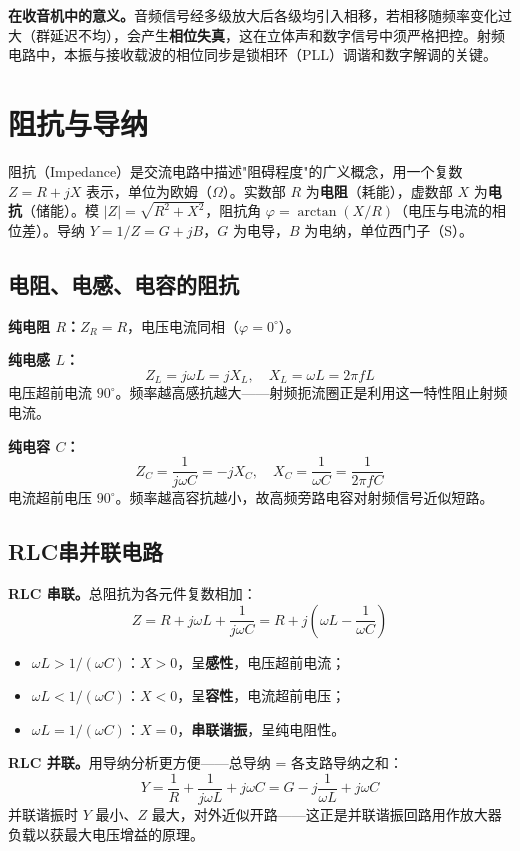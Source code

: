 \documentclass[12pt,UTF8]{ctexbook}
\begin{document}
\textbf{在收音机中的意义。}音频信号经多级放大后各级均引入相移，若相移随频率变化过大（群延迟不均），会产生\textbf{相位失真}，这在立体声和数字信号中须严格把控。射频电路中，本振与接收载波的相位同步是锁相环（PLL）调谐和数字解调的关键。

\section{阻抗与导纳}
\label{sec:impedance}

阻抗（Impedance）是交流电路中描述"阻碍程度"的广义概念，用一个复数 $Z = R + jX$ 表示，单位为欧姆（$\Omega$）。实数部 $R$ 为\textbf{电阻}（耗能），虚数部 $X$ 为\textbf{电抗}（储能）。模 $|Z| = \sqrt{R^2+X^2}$，阻抗角 $\varphi = \arctan(X/R)$（电压与电流的相位差）。导纳 $Y = 1/Z = G + jB$，$G$ 为电导，$B$ 为电纳，单位西门子（S）。

\subsection{电阻、电感、电容的阻抗}

\textbf{纯电阻 $R$：}$Z_R = R$，电压电流同相（$\varphi = 0^\circ$）。

\textbf{纯电感 $L$：}
\[
Z_L = j\omega L = jX_L,\quad X_L = \omega L = 2\pi f L
\]
电压超前电流 $90^\circ$。频率越高感抗越大——射频扼流圈正是利用这一特性阻止射频电流。

\textbf{纯电容 $C$：}
\[
Z_C = \frac{1}{j\omega C} = -jX_C,\quad X_C = \frac{1}{\omega C} = \frac{1}{2\pi f C}
\]
电流超前电压 $90^\circ$。频率越高容抗越小，故高频旁路电容对射频信号近似短路。

\subsection{RLC串并联电路}

\textbf{RLC 串联。}总阻抗为各元件复数相加：
\[
Z = R + j\omega L + \frac{1}{j\omega C} = R + j\!\left(\omega L - \frac{1}{\omega C}\right)
\]
\begin{itemize}
  \item $\omega L > 1/(\omega C)$：$X > 0$，呈\textbf{感性}，电压超前电流；
  \item $\omega L < 1/(\omega C)$：$X < 0$，呈\textbf{容性}，电流超前电压；
  \item $\omega L = 1/(\omega C)$：$X = 0$，\textbf{串联谐振}，呈纯电阻性。
\end{itemize}

\textbf{RLC 并联。}用导纳分析更方便——总导纳 = 各支路导纳之和：
\[
Y = \frac{1}{R} + \frac{1}{j\omega L} + j\omega C = G - j\frac{1}{\omega L} + j\omega C
\]
并联谐振时 $Y$ 最小、$Z$ 最大，对外近似开路——这正是并联谐振回路用作放大器负载以获最大电压增益的原理。
\end{document}

